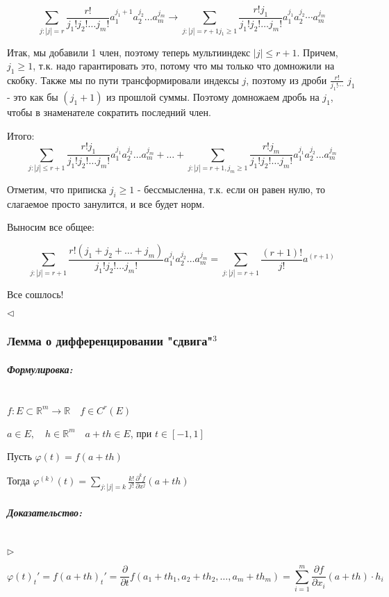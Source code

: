 \documentclass{article}
\let\vanillasubparagraph\subparagraph
\renewcommand{\subparagraph}[1]{\vanillasubparagraph{#1}\mbox{}\\}
\begin{document}
$$
\sum_{j: |j| = r} \frac{r!} {j_1!j_2!\dots j_m!} a^{j_1+1}_1 a^{j_2}_2 \dots a^{j_m}_m  \longrightarrow \sum_{j: |j| = r+1 j_1 \geq 1} \frac{r! j_1} {j_1! j_2! \dots j_m!} a^{j_1}_1 a^{j_2}_2 \cdots a^{j_m}_m
$$

Итак, мы добавили 1 член, поэтому теперь мультииндекс $|j| \leq r + 1$. Причем, $j_1 \geq 1$, т.к. надо гарантировать это, потому что мы только что домножили на скобку. Также мы по пути трансформировали индексы $j$, поэтому из дроби $\frac{r!}{j_1!\cdots}$ $j_1$ - это как бы $(j_1 + 1)$ из прошлой суммы. Поэтому домножаем дробь на $j_1$, чтобы в знаменателе сократить последний член. 

Итого:
$$
\sum_{j: |j| \leq r + 1} \frac{r! j_1} {j_1!j_2!\dots j_m!} a^{j_1}_1 a^{j_2}_2 \dots a^{j_m}_m + \dots + \sum_{j: |j| = r + 1, j_m \geq 1} \frac {r! j_m} {j_1! j_2! \dots j_m!} a^{j_1}_1 a^{j_2}_2 \dots a^{j_m}_m
$$

Отметим, что приписка $j_i \geq 1$ - бессмысленна, т.к. если он равен нулю, то слагаемое просто занулится, и все будет норм.

Выносим все общее:

$$
\sum_{j: |j| = r + 1} \frac {r! ( j_1 + j_2 + \dots + j_m)}{j_1! j_2! \dots j_m!} a_1^{j_1} a_2^{j_2} \dots a_m^{j_m} = \sum_{j: |j| = r + 1} \frac{(r+1)!}{j!} a^{(r + 1)}
$$

Все сошлось!

$\lhd$

\subsubsection{Лемма о дифференцировании "сдвига"\texorpdfstring{$^3$}{}}


\subparagraph{Формулировка: }

$ f:E\subset \mathbb R ^m \to \mathbb R \quad f \in C^r(E)$

$ a \in E,\quad h \in \mathbb R ^m \quad a + th \in E$, при $t \in [-1, 1]$

Пусть $\varphi(t) = f(a + th)$

Тогда $\varphi^{(k)}(t) = \sum_{j: |j| = k} \frac {k!} {j!} \frac {\partial ^k f} {\partial x ^j} (a + th)$

\subparagraph{Доказательство: }

$\rhd$

$$
\varphi(t)_t' = f(a + th)_t' = \frac {\partial}{\partial t} f(a_1 + th_1, a_2 + th_2, \dots, a_m + th_m) = \sum_{i = 1}^m \frac{\partial f} {\partial x_i} (a + th) \cdot h_i
$$
\end{document}
